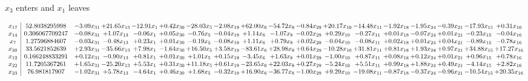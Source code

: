 \documentclass[9pt]{article}
\begin{document}
 $ x_{3} $ enters and $ x_{1} $ leaves 

 \[\begin{array}{c| c c@{\hskip 2pt} c@{\hskip 2pt} c@{\hskip 2pt} c@{\hskip 2pt} c@{\hskip 2pt} c@{\hskip 2pt} c@{\hskip 2pt} c@{\hskip 2pt} c@{\hskip 2pt} c@{\hskip 2pt} c@{\hskip 2pt} c@{\hskip 2pt} c@{\hskip 2pt} c@{\hskip 2pt} c@{\hskip 2pt} c@{\hskip 2pt} }
 x_{17}   &  52.8038295998 & -3.09 x_{31} & + 21.65 x_{13} & -12.91 x_{1} & +  0.42 x_{30} & -28.03 x_{5} & -2.08 x_{19} & + 62.00 x_{6} & -54.72 x_{8} & -0.84 x_{29} & + 20.17 x_{10} & -14.48 x_{11} & -1.92 x_{18} & -1.95 x_{24} & -0.39 x_{21} & -17.93 x_{15} & +  0.31 x_{16}\\
 x_{14}   &  0.306067709247 & -0.08 x_{31} & +  1.07 x_{13} & -0.06 x_{1} & +  0.05 x_{30} & -0.76 x_{5} & -0.04 x_{19} & +  1.14 x_{6} & -1.07 x_{8} & -0.02 x_{29} & +  0.29 x_{10} & -0.27 x_{11} & +  0.01 x_{18} & -0.07 x_{24} & +  0.01 x_{21} & -0.23 x_{15} & -0.04 x_{16}\\
 x_{7}   &  1.27596884607 & -0.03 x_{31} & -0.48 x_{13} & +  0.23 x_{1} & +  0.01 x_{30} & -0.19 x_{5} & -0.08 x_{19} & +  1.11 x_{6} & +  0.79 x_{8} & +  0.02 x_{29} & -0.04 x_{10} & -0.08 x_{11} & +  0.02 x_{18} & +  0.01 x_{24} & +  0.04 x_{21} & -0.89 x_{15} & -0.78 x_{16}\\
 x_{20}   &  33.5621852639 & +  2.93 x_{31} & -35.66 x_{13} & +  7.98 x_{1} & -1.64 x_{30} & + 16.50 x_{5} & +  3.58 x_{19} & -83.61 x_{6} & + 28.98 x_{8} & +  0.64 x_{29} & -10.28 x_{10} & + 31.81 x_{11} & +  0.81 x_{18} & +  1.93 x_{24} & +  0.97 x_{21} & + 34.88 x_{15} & + 17.27 x_{16}\\
 x_{12}   &  0.166248833291 & +  0.12 x_{31} & -0.90 x_{13} & +  0.81 x_{1} & +  0.01 x_{30} & +  1.01 x_{5} & +  0.15 x_{19} & -3.45 x_{6} & +  1.63 x_{8} & +  0.01 x_{29} & -1.00 x_{10} & +  0.87 x_{11} & +  0.08 x_{18} & +  0.12 x_{24} & +  0.01 x_{21} & +  0.96 x_{15} & +  0.78 x_{16}\\
 x_{22}   &  11.7205367261 & +  1.65 x_{31} & -25.20 x_{13} & +  5.53 x_{1} & +  0.31 x_{30} & + 11.18 x_{5} & +  0.61 x_{19} & -23.65 x_{6} & + 22.03 x_{8} & +  0.27 x_{29} & -5.24 x_{10} & +  5.51 x_{11} & +  0.99 x_{18} & +  1.88 x_{24} & +  0.49 x_{21} & -4.14 x_{15} & +  2.82 x_{16}\\
 x_{23}   &  76.981817907 & -1.02 x_{31} & +  5.78 x_{13} & -4.64 x_{1} & +  0.46 x_{30} & +  1.68 x_{5} & -0.32 x_{19} & + 16.90 x_{6} & -36.77 x_{8} & -1.00 x_{29} & +  9.29 x_{10} & -19.08 x_{11} & -0.87 x_{18} & -0.37 x_{24} & -0.96 x_{21} & -10.54 x_{15} & + 20.35 x_{16}\\

\end{array}\]
\end{document}
